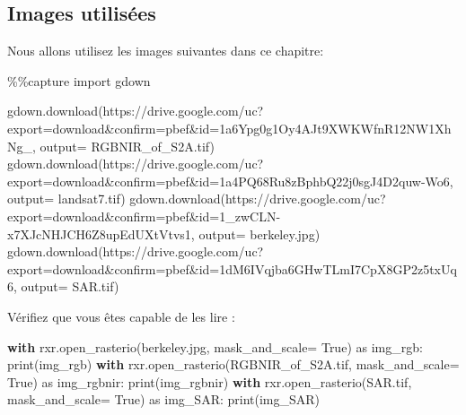 \documentclass[
  11pt,
  letterpaper,
  open=any,
  twoside=false,
  french]{scrbook}
\newenvironment{Shaded}{\begin{snugshade}}{\end{snugshade}}
\newcommand{\BuiltInTok}[1]{\textcolor[rgb]{0.00,0.23,0.31}{#1}}
\newcommand{\ControlFlowTok}[1]{\textcolor[rgb]{0.00,0.23,0.31}{\textbf{#1}}}
\newcommand{\ImportTok}[1]{\textcolor[rgb]{0.00,0.46,0.62}{#1}}
\newcommand{\NormalTok}[1]{\textcolor[rgb]{0.00,0.23,0.31}{#1}}
\newcommand{\OperatorTok}[1]{\textcolor[rgb]{0.37,0.37,0.37}{#1}}
\newcommand{\StringTok}[1]{\textcolor[rgb]{0.13,0.47,0.30}{#1}}
\newcommand{\VariableTok}[1]{\textcolor[rgb]{0.07,0.07,0.07}{#1}}
\begin{document}
\subsection{Images utilisées}\label{images-utilisuxe9es-1}

Nous allons utilisez les images suivantes dans ce chapitre:

\begin{Shaded}
\begin{Highlighting}[]
\OperatorTok{\%\%}\NormalTok{capture}
\ImportTok{import}\NormalTok{ gdown}

\NormalTok{gdown.download(}\StringTok{\textquotesingle{}https://drive.google.com/uc?export=download\&confirm=pbef\&id=1a6Ypg0g1Oy4AJt9XWKWfnR12NW1XhNg\_\textquotesingle{}}\NormalTok{, output}\OperatorTok{=} \StringTok{\textquotesingle{}RGBNIR\_of\_S2A.tif\textquotesingle{}}\NormalTok{)}
\NormalTok{gdown.download(}\StringTok{\textquotesingle{}https://drive.google.com/uc?export=download\&confirm=pbef\&id=1a4PQ68Ru8zBphbQ22j0sgJ4D2quw{-}Wo6\textquotesingle{}}\NormalTok{, output}\OperatorTok{=} \StringTok{\textquotesingle{}landsat7.tif\textquotesingle{}}\NormalTok{)}
\NormalTok{gdown.download(}\StringTok{\textquotesingle{}https://drive.google.com/uc?export=download\&confirm=pbef\&id=1\_zwCLN{-}x7XJcNHJCH6Z8upEdUXtVtvs1\textquotesingle{}}\NormalTok{, output}\OperatorTok{=} \StringTok{\textquotesingle{}berkeley.jpg\textquotesingle{}}\NormalTok{)}
\NormalTok{gdown.download(}\StringTok{\textquotesingle{}https://drive.google.com/uc?export=download\&confirm=pbef\&id=1dM6IVqjba6GHwTLmI7CpX8GP2z5txUq6\textquotesingle{}}\NormalTok{, output}\OperatorTok{=} \StringTok{\textquotesingle{}SAR.tif\textquotesingle{}}\NormalTok{)}
\end{Highlighting}
\end{Shaded}

Vérifiez que vous êtes capable de les lire :

\begin{Shaded}
\begin{Highlighting}[]
\ControlFlowTok{with}\NormalTok{ rxr.open\_rasterio(}\StringTok{\textquotesingle{}berkeley.jpg\textquotesingle{}}\NormalTok{, mask\_and\_scale}\OperatorTok{=} \VariableTok{True}\NormalTok{) }\ImportTok{as}\NormalTok{ img\_rgb:}
    \BuiltInTok{print}\NormalTok{(img\_rgb)}
\ControlFlowTok{with}\NormalTok{ rxr.open\_rasterio(}\StringTok{\textquotesingle{}RGBNIR\_of\_S2A.tif\textquotesingle{}}\NormalTok{, mask\_and\_scale}\OperatorTok{=} \VariableTok{True}\NormalTok{) }\ImportTok{as}\NormalTok{ img\_rgbnir:}
    \BuiltInTok{print}\NormalTok{(img\_rgbnir)}
\ControlFlowTok{with}\NormalTok{ rxr.open\_rasterio(}\StringTok{\textquotesingle{}SAR.tif\textquotesingle{}}\NormalTok{, mask\_and\_scale}\OperatorTok{=} \VariableTok{True}\NormalTok{) }\ImportTok{as}\NormalTok{ img\_SAR:}
    \BuiltInTok{print}\NormalTok{(img\_SAR)}
\end{Highlighting}
\end{Shaded}
\end{document}
